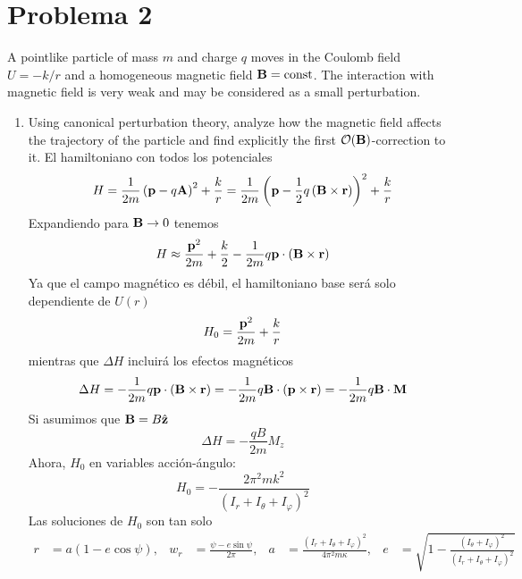 \documentclass[]{article}
\numberwithin{equation}{section}
\begin{document}
\section{Problema 2}
A pointlike particle of mass $m$ and charge $q$ moves in the Coulomb field $U = -k/r$ and a homogeneous magnetic field $\mathbf{B} = \mathrm{const}$. The interaction with magnetic field is very weak and may be considered as a small perturbation.
\begin{enumerate}
	\item[(a)] Using canonical perturbation theory, analyze how the magnetic field affects the trajectory of the particle and find explicitly the first $\mathcal{O} (\mathbf{B})$-correction to it.
	\resp El hamiltoniano con todos los potenciales
	\begin{equation}
		H = \frac{1}{2m} \left(\mathbf{p} - q\mathbf{A}\right)^2 + \frac{k}{r} = \frac{1}{2m} \left(\mathbf{p} - \frac{1}{2} q \left(\mathbf{B}\times\mathbf{r}\right)\right)^2 + \frac{k}{r}
	\end{equation}
	Expandiendo para $\mathbf{B}\to 0$ tenemos
	\begin{equation}
		H \approx \frac{\mathbf{p}^2}{2 m} + \frac{k}{2} - \frac{1}{2m} q \mathbf{p} \cdot (\mathbf{B}\times\mathbf{r}) 
	\end{equation}
	Ya que el campo magnético es débil, el hamiltoniano base será solo dependiente de $U(r)$
	\begin{equation}
		H_0 =  \frac{\mathbf{p}^2}{2 m} + \frac{k}{r}
	\end{equation}
	mientras que $\Delta H$ incluirá los efectos magnéticos
	\begin{equation}
		\Delta H =  - \frac{1}{2m} q \mathbf{p} \cdot (\mathbf{B}\times\mathbf{r}) =  - \frac{1}{2m} q \mathbf{B} \cdot (\mathbf{p}\times\mathbf{r}) =  - \frac{1}{2m} q \mathbf{B} \cdot \mathbf{M} 
	\end{equation}
	Si asumimos que $\mathbf{B} = B\hat{\mathbf{z}}$
	\begin{equation}
		\Delta H = - \frac{q B}{2m} M_z
	\end{equation}
	Ahora, $H_0$ en variables acción-ángulo:
	\begin{equation}
		H_0 = - \frac{2\pi^2 m k^2}{\left(I_r + I_\theta + I_\varphi\right)^2}
	\end{equation}
	Las soluciones de $H_0$ son tan solo
	\begin{align}
		r &= a(1 - e\cos\psi), & w_r &= \frac{\psi - e\sin\psi}{2\pi}, & a &= \frac{\left(I_r + I_\theta + I_\varphi\right)^2}{4\pi^2 m\kappa}, & e &= \sqrt{1 - \frac{\left(I_\theta + I_\varphi\right)^2}{\left(I_r + I_\theta + I_\varphi\right)^2}}
	\end{align}

\end{enumerate}
\end{document}
